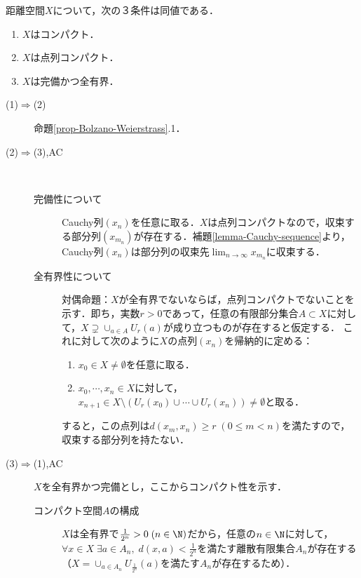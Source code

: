 \documentclass[uplatex,dvipdfmx]{jsreport}
\begin{document}
\begin{theorem}[AC]\label{thm-characterization-of-compact-metric-space}
    距離空間$X$について，次の３条件は同値である．
    \begin{enumerate}
        \item $X$はコンパクト．
        \item $X$は点列コンパクト．
        \item $X$は完備かつ全有界．
    \end{enumerate}
\end{theorem}
\begin{Proof}\mbox{}
    \begin{description}
        \item[(1)$\Rightarrow$(2)] 
        命題\ref{prop-Bolzano-Weierstrass}.1．
        \item[(2)$\Rightarrow$(3),AC] \mbox{}\\
        \begin{description}
            \item[完備性について] 
            Cauchy列$(x_n)$を任意に取る．$X$は点列コンパクトなので，収束する部分列$(x_{m_n})$が存在する．補題\ref{lemma-Cauchy-sequence}より，Cauchy列$(x_n)$は部分列の収束先$\lim_{n\to\infty}x_{m_n}$に収束する．
            \item[全有界性について] 
            対偶命題：$X$が全有界でないならば，点列コンパクトでないことを示す．即ち，実数$r>0$であって，任意の有限部分集合$A\subset X$に対して，$X\supsetneq\cup_{a\in A}U_r(a)$が成り立つものが存在すると仮定する．
            これに対して次のように$X$の点列$(x_n)$を帰納的に定める：
            \begin{enumerate}
                \item $x_0\in X\ne\emptyset$を任意に取る．
                \item $x_0,\cdots,x_n\in X$に対して，$x_{n+1}\in X\setminus(U_r(x_0)\cup\cdots\cup U_r(x_n))\ne\emptyset$と取る．
            \end{enumerate}
        すると，この点列は$d(x_m,x_n)\ge r\;(0\le m<n)$を満たすので，収束する部分列を持たない．
        \end{description}
        \item[(3)$\Rightarrow$(1),AC] $X$を全有界かつ完備とし，ここからコンパクト性を示す．
        \begin{description}
            \item[コンパクト空間$A$の構成] 
            $X$は全有界で$\frac{1}{2^n}>0\;(n\in\N)$だから，任意の$n\in\N$に対して，$\forall x\in X\;\exists a\in A_n,\; d(x,a)<\frac{1}{2^n}$を満たす離散有限集合$A_n$が存在する（$X=\cup_{a\in A_n}U_{\frac{1}{2^n}}(a)$を満たす$A_n$が存在するため）．

\end{description}
\end{description}
\end{Proof}
\end{document}

